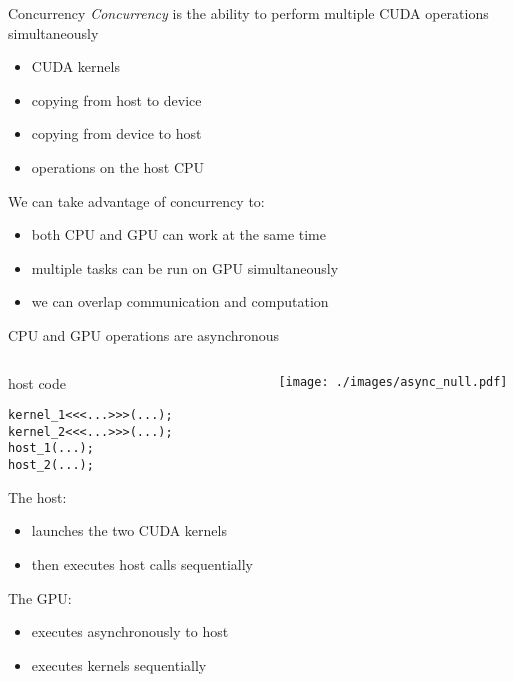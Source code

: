 
\begin{frame}[fragile]{Concurrency}
    \emph{Concurrency} is the ability to perform multiple CUDA operations simultaneously
    \begin{itemize}
        \item CUDA kernels
        \item copying from host to device
        \item copying from device to host
        \item operations on the host CPU
    \end{itemize}

    We can take advantage of concurrency to:
    \begin{itemize}
        \item both CPU and GPU can work at the same time
        \item multiple tasks can be run on GPU simultaneously
        \item we can overlap communication and computation
    \end{itemize}

\end{frame}

\begin{frame}[fragile]{CPU and GPU operations are asynchronous}
    \begin{columns}[T]
        \begin{column}{0.5\textwidth}
            \begin{codecolumn}{host code}
                \begin{lstlisting}[style=boxcudatiny]
kernel_1<<<...>>>(...);
kernel_2<<<...>>>(...);
host_1(...);
host_2(...);
                \end{lstlisting}
            \end{codecolumn}
        The host:
        \begin{itemize}
            \item launches the two CUDA kernels
            \item then executes host calls sequentially 
        \end{itemize}
        The GPU:
        \begin{itemize}
            \item executes asynchronously to host
            \item executes kernels sequentially
        \end{itemize}
        \end{column}
        \begin{column}{0.5\textwidth}
            \texttt{[image: ./images/async\_null.pdf]}
        \end{column}
    \end{columns}
\end{frame}

